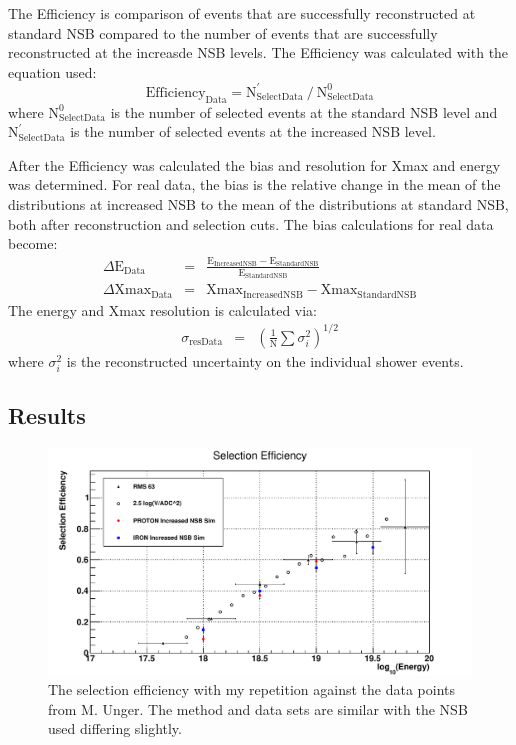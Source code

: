 The Efficiency is comparison of events that are successfully reconstructed at standard NSB compared to the number of events that are successfully reconstructed at the increasde NSB levels. The Efficiency was calculated with the equation used:
\begin{equation}
\mathrm{Efficiency}_{\mathrm{Data}} = \mathrm{N}^{'}_{\mathrm{SelectData}} \ / \ \mathrm{N}^0_{\mathrm{SelectData}}
\end{equation}
where $\mathrm{N}^{0}_{\mathrm{SelectData}}$ is the number of selected events at the standard NSB level and $\mathrm{N}^{'}_{\mathrm{SelectData}}$ is the number of selected events at the increased NSB
level. 

After the Efficiency was calculated the bias and resolution for Xmax and energy was determined. For real data, the bias is the relative change in the mean of the distributions at increased NSB to the mean of the distributions at standard NSB, both after reconstruction and selection cuts. The bias calculations for real data become:
\begin{eqnarray}
\Delta \mathrm{E}_{\mathrm{Data}} &=& \frac{\mathrm{E}_{\mathrm{IncreasedNSB}} - \mathrm{E}_{\mathrm{StandardNSB}}}{\mathrm{E}_{\mathrm{StandardNSB}}} \label{eq:energybias_data} \\
\Delta \mathrm{Xmax}_{\mathrm{Data}} &=& \mathrm{Xmax}_{\mathrm{IncreasedNSB}} - \mathrm{Xmax}_{\mathrm{StandardNSB}}\label{eq:xmaxbias_data}
\end{eqnarray} 
The energy and Xmax resolution is calculated via:
\begin{eqnarray}
\sigma_{\mathrm{resData}} &=& \left( \frac{1}{\mathrm{N}} \sum \sigma^2_i \right)^{1/2}
\end{eqnarray}
where $\sigma^2_i$ is the reconstructed uncertainty on the individual shower events.

\subsection{Results}

\begin{figure}
\centering
\includegraphics[width=\textwidth]{chapters/graphs/SelectionEff/SelectionEff_errorbars_10timesNSB.pdf}
\caption{The selection efficiency with my repetition against the data points from M. Unger. The method and data sets are similar with the NSB used differing slightly.}
\end{figure}

